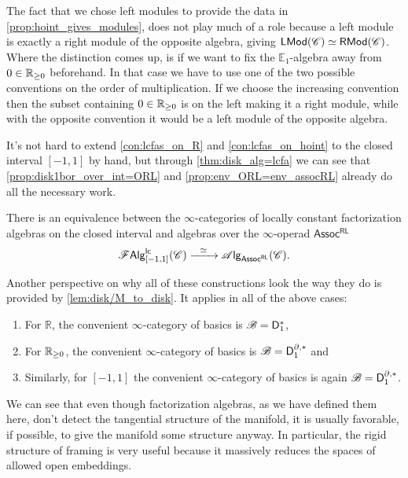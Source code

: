\documentclass[../text]{subfiles}
\begin{document}
\begin{remark}\label{rem:left_or_right_module}
    The fact that we chose left modules to provide the data in \cref{prop:hoint_gives_modules}, does not play much of a role because a left module is exactly a right module of the opposite algebra, giving $\mathsf{LMod}(\mathscr{C}) \simeq \mathsf{RMod}(\mathscr{C})$. Where the distinction comes up, is if we want to fix the $\mathbb{E}_1$-algebra away from $0 \in \mathbb{R}_{\geq 0}$ beforehand. In that case we have to use one of the two possible conventions on the order of multiplication. If we choose the increasing convention then the subset containing $0 \in \mathbb{R}_{\geq 0}$ is on the left making it a right module, while with the opposite convention it would be a left module of the opposite algebra.
\end{remark}

It's not hard to extend \cref{con:lcfas_on_R} and \cref{con:lcfas_on_hoint} to the closed interval $[-1,1]$ by hand, but through \cref{thm:disk_alg=lcfa} we can see that \cref{prop:disk1bor_over_int=ORL} and \cref{prop:env_ORL=env_assocRL} already do all the necessary work.

\begin{corollary}
    There is an equivalence between the $\infty$-categories of locally constant factorization algebras on the closed interval and algebras over the $\infty$-operad $\mathsf{Assoc^{RL}}$
    \begin{equation}
        \lcfa_{[-1,1]} (\catC) \xrightarrow{\ \ \simeq \ \ } \alg{\mathsf{Assoc^{RL}}} (\catC).
    \end{equation} 
\end{corollary}

\begin{remark}
    Another perspective on why all of these constructions look the way they do is provided by \cref{lem:disk/M_to_disk}. It applies in all of the above cases:
    \begin{enumerate}
        \item For $\mathbb{R}$, the convenient $\infty$-category of basics is $\mathscr{B} = \mathsf{D}_1^*$,
        \item For $\mathbb{R}_{\geq 0}$, the convenient $\infty$-category of basics is $\mathscr{B} = \mathsf{D}_1^{\partial, *}$ and
        \item Similarly, for $[-1,1]$ the convenient $\infty$-category of basics is again $\mathscr{B} = \mathsf{D}_1^{\partial, *}$.
    \end{enumerate}
    We can see that even though factorization algebras, as we have defined them here, don't detect the tangential structure of the manifold, it is usually favorable, if possible, to give the manifold some structure anyway. In particular, the rigid structure of framing is very useful because it massively reduces the spaces of allowed open embeddings.
\end{remark}
\end{document}
